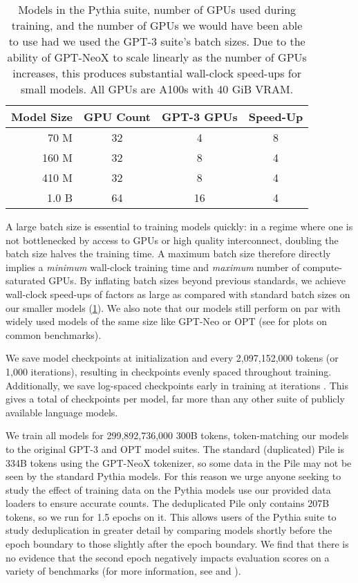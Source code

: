 \documentclass{article}
\theoremstyle{plain}
\theoremstyle{definition}
\theoremstyle{remark}
\begin{document}
\begin{table}[h]
    \centering
    \begin{tabular}{rccc}\toprule
     Model Size & GPU Count & GPT-3 GPUs & Speed-Up\\\midrule
          70 M  & 32 & 4 & 8\\
         160 M  & 32 & 8 & 4\\
         410 M  & 32 & 8 & 4\\
         1.0 B  & 64 & 16 & 4\\\bottomrule
    \end{tabular}
    \caption{Models in the Pythia suite, number of GPUs used during training, and the number of GPUs we would have been able to use had we used the GPT-3 suite's batch sizes. Due to the ability of GPT-NeoX to scale linearly as the number of GPUs increases, this produces substantial wall-clock speed-ups for small models. All GPUs are A100s with 40 GiB VRAM.}
	\label{table:hardware}
\end{table}

A large batch size is essential to training models quickly: in a regime where one is not bottlenecked by access to GPUs or high quality interconnect, doubling the batch size halves the training time. A maximum batch size therefore directly implies a \textit{minimum} wall-clock training time and \textit{maximum} number of compute-saturated GPUs. By inflating batch sizes beyond previous standards, we achieve wall-clock speed-ups of factors as large as  compared with standard batch sizes on our smaller models (\cref{table:hardware}). We also note that our models still perform on par with widely used models of the same size like GPT-Neo \citep{black2021gpt} or OPT \citep{zhang2022opt} (see  for plots on common benchmarks).

We save model checkpoints at initialization and every 2,097,152,000 tokens (or 1,000 iterations), resulting in  checkpoints evenly spaced throughout training. Additionally, we save log-spaced checkpoints early in training at iterations . This gives a total of  checkpoints per model, far more than any other suite of publicly available language models.

We train all models for 299,892,736,000  300B tokens, token-matching our models to the original GPT-3 and OPT model suites. The standard (duplicated) Pile is 334B tokens using the GPT-NeoX tokenizer, so some data in the Pile may not be seen by the standard Pythia models. For this reason we urge anyone seeking to study the effect of training data on the Pythia models use our provided data loaders to ensure accurate counts. The deduplicated Pile only contains 207B tokens, so we run for 1.5 epochs on it. This allows users of the Pythia suite to study deduplication in greater detail by comparing models shortly before the epoch boundary to those slightly after the epoch boundary. We find that there is no evidence that the second epoch negatively impacts evaluation scores on a variety of benchmarks (for more information, see  and ).
\end{document}
